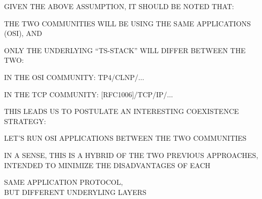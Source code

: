 \begin{bwslide}

\begin{nrtc}
\item	GIVEN THE ABOVE ASSUMPTION, IT SHOULD BE NOTED THAT:
    \begin{nrtc}
    \item	THE TWO COMMUNITIES WILL BE USING THE SAME APPLICATIONS (OSI),
		AND

    \item	ONLY THE UNDERLYING ``TS-STACK'' WILL DIFFER BETWEEN THE TWO:
	\begin{nrtc}
	\item	IN THE OSI COMMUNITY: TP4/CLNP/$\ldots$

	\item	IN THE TCP COMMUNITY: [RFC1006]/TCP/IP/$\ldots$
	\end{nrtc}
    \end{nrtc}

\item	THIS LEADS US TO POSTULATE AN INTERESTING COEXISTENCE
	STRATEGY:
    \begin{nrtc}
    \item	LET'S RUN OSI APPLICATIONS BETWEEN THE TWO COMMUNITIES
    \end{nrtc}

\item	IN A SENSE, THIS IS A HYBRID OF THE TWO PREVIOUS APPROACHES,
	INTENDED TO MINIMIZE THE DISADVANTAGES OF EACH
    \begin{nrtc}
	\item	SAME APPLICATION PROTOCOL,\\
		BUT DIFFERENT UNDERYLING LAYERS
    \end{nrtc}
\end{nrtc}
\end{bwslide}


